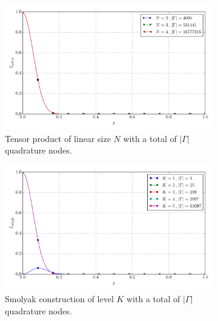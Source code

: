 \documentclass[a4paper,10pt]{article}
\begin{document}
\begin{figure}[ht!]
  \begin{subfigure}[t]{0.5\linewidth}
    \includegraphics[width=\linewidth]{./plots/tp_sg_12d_conv_p_(1,0,0,0,0,0,0,0,0,0,0,0)_(1,0,0,0,0,0,0,0,0,0,0,0)_val_nsd_tp.pdf}
    \caption{Tensor product of linear size $N$ with a total of $|\Gamma|$ quadrature nodes.}
    \label{fig:tp_sg_12d_conv_p_100000000000_100000000000_val_nsd_tp}
  \end{subfigure}
  \begin{subfigure}[t]{0.5\linewidth}
    \includegraphics[width=\linewidth]{./plots/tp_sg_12d_conv_p_(1,0,0,0,0,0,0,0,0,0,0,0)_(1,0,0,0,0,0,0,0,0,0,0,0)_val_nsd_gk.pdf}
    \caption{Smolyak construction of level $K$ with a total of $|\Gamma|$ quadrature nodes.}
    \label{fig:tp_sg_12d_conv_p_100000000000_100000000000_val_nsd_gk}
  \end{subfigure} \\
  \begin{subfigure}[t]{0.5\linewidth}

\end{subfigure}
\end{figure}
\end{document}
